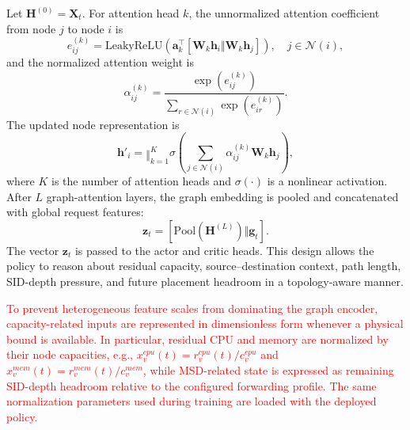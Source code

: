 \documentclass[final,5p]{elsarticle}
\newcommand{\rev}[1]{\textcolor{red}{#1}}
\begin{document}
Let \(\mathbf{H}^{(0)}=\mathbf{X}_t\). For attention head \(k\), the unnormalized attention coefficient from node \(j\) to node \(i\) is
\begin{equation}
    e_{ij}^{(k)}
    =
    \mathrm{LeakyReLU}
    \left(
    \mathbf{a}_{k}^{\top}
    [\mathbf{W}_{k}\mathbf{h}_i \Vert \mathbf{W}_{k}\mathbf{h}_j]
    \right),
    \quad j\in\mathcal{N}(i),
\end{equation}
and the normalized attention weight is
\begin{equation}
    \alpha_{ij}^{(k)}
    =
    \frac{\exp(e_{ij}^{(k)})}
    {\sum_{r\in\mathcal{N}(i)}\exp(e_{ir}^{(k)})}.
\end{equation}
The updated node representation is
\begin{equation}
    \mathbf{h}'_i
    =
    \mathop{\Vert}_{k=1}^{K}
    \sigma
    \left(
    \sum_{j\in\mathcal{N}(i)}
    \alpha_{ij}^{(k)}\mathbf{W}_{k}\mathbf{h}_j
    \right),
\end{equation}
where \(K\) is the number of attention heads and \(\sigma(\cdot)\) is a nonlinear activation. After \(L\) graph-attention layers, the graph embedding is pooled and concatenated with global request features:
\begin{equation}
    \mathbf{z}_t=
    [\mathrm{Pool}(\mathbf{H}^{(L)})\Vert \mathbf{g}_t].
\end{equation}
The vector \(\mathbf{z}_t\) is passed to the actor and critic heads. This design allows the policy to reason about residual capacity, source--destination context, path length, SID-depth pressure, and future placement headroom in a topology-aware manner.

\rev{To prevent heterogeneous feature scales from dominating the graph encoder, capacity-related inputs are represented in dimensionless form whenever a physical bound is available. In particular, residual CPU and memory are normalized by their node capacities, e.g., \(x_v^{cpu}(t)=r_v^{cpu}(t)/c_v^{cpu}\) and \(x_v^{mem}(t)=r_v^{mem}(t)/c_v^{mem}\), while MSD-related state is expressed as remaining SID-depth headroom relative to the configured forwarding profile. The same normalization parameters used during training are loaded with the deployed policy.}
\end{document}

